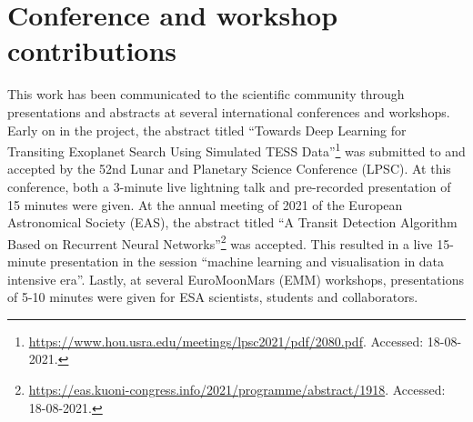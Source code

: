 
\section{Conference and workshop contributions}


This work has been communicated to the scientific community through presentations and abstracts at several international conferences and workshops. Early on in the project, the abstract titled ``Towards Deep Learning for Transiting Exoplanet Search Using Simulated TESS Data''\footnote{\url{https://www.hou.usra.edu/meetings/lpsc2021/pdf/2080.pdf}. Accessed: 18-08-2021.} \citep{rusticus2021towards} was submitted to and accepted by the 52nd Lunar and Planetary Science Conference (LPSC). At this conference, both a 3-minute live lightning talk and pre-recorded presentation of 15 minutes were given. At the annual meeting of 2021 of the European Astronomical Society (EAS), the abstract titled ``A Transit Detection Algorithm Based on Recurrent Neural Networks''\footnote{\url{https://eas.kuoni-congress.info/2021/programme/abstract/1918}. Accessed: 18-08-2021.} was accepted. This resulted in a live 15-minute presentation in the session ``machine learning and visualisation in data intensive era''. Lastly, at several EuroMoonMars (EMM) workshops, presentations of 5-10 minutes were given for ESA scientists, students and collaborators.